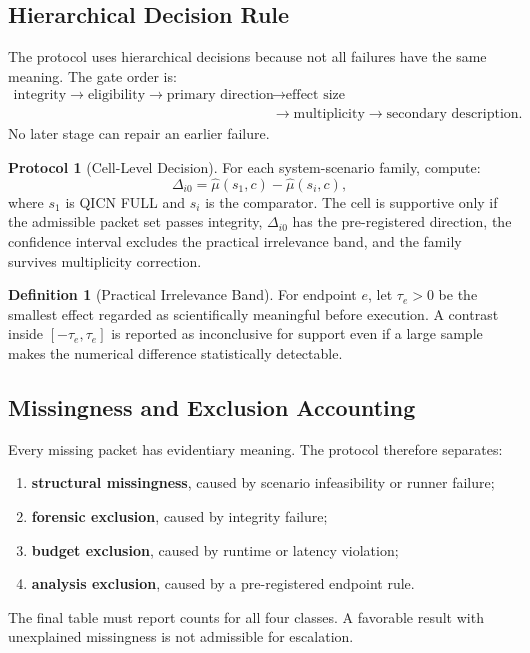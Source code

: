 \documentclass[11pt,a4paper]{article}
\theoremstyle{definition}
\newtheorem{definition}[theorem]{Definition}
\newtheorem{protocol}[theorem]{Protocol}
\begin{document}
\subsection{Hierarchical Decision Rule}
The protocol uses hierarchical decisions because not all failures have the same
meaning. The gate order is:
\[
\begin{aligned}
\text{integrity} \rightarrow \text{eligibility} \rightarrow
\text{primary direction}&\rightarrow \text{effect size}\\
&\rightarrow\text{multiplicity} \rightarrow \text{secondary description}.
\end{aligned}
\]
No later stage can repair an earlier failure.

\begin{protocol}[Cell-Level Decision]
For each system-scenario family, compute:
\[
\Delta_{i0} = \hat{\mu}(s_1,c)-\hat{\mu}(s_i,c),
\]
where $s_1$ is QICN FULL and $s_i$ is the comparator. The cell is supportive only
if the admissible packet set passes integrity, $\Delta_{i0}$ has the
pre-registered direction, the confidence interval excludes the practical
irrelevance band, and the family survives multiplicity correction.
\end{protocol}

\begin{definition}[Practical Irrelevance Band]
For endpoint $e$, let $\tau_e>0$ be the smallest effect regarded as scientifically
meaningful before execution. A contrast inside $[-\tau_e,\tau_e]$ is reported as
inconclusive for support even if a large sample makes the numerical difference
statistically detectable.
\end{definition}

\subsection{Missingness and Exclusion Accounting}
Every missing packet has evidentiary meaning. The protocol therefore separates:
\begin{enumerate}
\item \textbf{structural missingness}, caused by scenario infeasibility or runner
failure;
\item \textbf{forensic exclusion}, caused by integrity failure;
\item \textbf{budget exclusion}, caused by runtime or latency violation;
\item \textbf{analysis exclusion}, caused by a pre-registered endpoint rule.
\end{enumerate}
The final table must report counts for all four classes. A favorable result with
unexplained missingness is not admissible for escalation.
\end{document}

